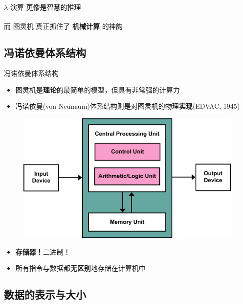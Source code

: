 \documentclass{myslide}
\begin{document}
\begin{frame}
\begin{center}
$\lambda$-演算 更像是智慧的推理\\
\quad\\
而 图灵机 真正抓住了 {\Large\textbf{机械计算}} 的神韵
\end{center}
\end{frame}

\subsection{冯诺依曼体系结构}
\begin{frame}
\subsectionpage
\end{frame}


\begin{frame}{冯诺依曼体系结构}
\begin{itemize}
	\item 图灵机是\textbf{理论}的最简单的模型，但具有非常强的计算力
	\item 冯诺依曼(von Neumann)体系结构则是对图灵机的物理\textbf{实现}(EDVAC, 1945)
\end{itemize}
\begin{figure}
\centering
\includegraphics[width=0.5\linewidth]{fig/Lecture2/Von_Neumann_Architecture.png}
\end{figure}
\begin{itemize}[<+->]
	\item \textbf{存储器！}二进制！
	\item 所有指令与数据都\textbf{无区别}地存储在计算机中
\end{itemize}
\end{frame}

\subsection{数据的表示与大小}
\begin{frame}
\subsectionpage
\end{frame}
\end{document}
